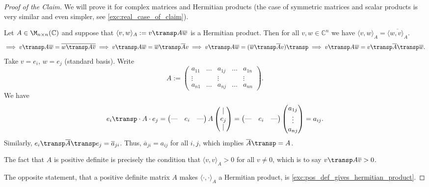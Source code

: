 \begin{proof}[Proof of the Claim]
    We will prove it for complex matrices and Hermitian products (the case of symmetric matrices and scalar products is very similar and even simpler, see \cref{exc:real_case_of_claim}).

    Let $A \in \M_{n \times n}(\mathbb{C})$ and suppose that $\langle v, w \rangle_A := v\transp A \overline{w}$ is a Hermitian product.
    Then for all $v, w \in \mathbb{C}^n$ we have $\langle v, w \rangle_A = \overline{\langle w, v \rangle_A}$.
    \[
        \implies v\transp A \overline{w} = \overline{w\transp A \overline{v}} \implies v\transp A \overline{w} = \overline{w}\transp \overline{A} v \implies v\transp A \overline{w} = (\overline{w}\transp \overline{A} v)\transp \implies v\transp A \overline{w} = v\transp \overline{A}\transp \overline{w}.
    \]
    Take $v = e_i$, $w = e_j$ (standard basis). Write
    \[
        A := \begin{pmatrix} a_{11} & \dots & a_{1j} & \dots & a_{1n} \\ \vdots & & \vdots & & \vdots \\ a_{n1} & \dots & a_{nj} & \dots & a_{nn} \end{pmatrix}.
    \]
    We have
    \[
        e_i\transp \cdot A \cdot e_j = \begin{pmatrix} \text{---} & e_i & \text{---} \end{pmatrix} A \begin{pmatrix} | \\ e_j \\ | \end{pmatrix} = \begin{pmatrix} \text{---} & e_i & \text{---} \end{pmatrix} \begin{pmatrix} a_{1j} \\ \vdots \\ a_{nj} \end{pmatrix} = a_{ij}.
    \]
    Similarly, $e_i\transp \overline{A}\transp e_j = \overline{a}_{ji}$.
    Thus, $\overline{a}_{ji} = a_{ij}$ for all $i, j$, which implies $\overline{A}\transp = A$.
    
    The fact that $A$ is positive definite is precisely the condition that $\langle v, v \rangle_A > 0$ for all $v \neq 0$, which is to say $v\transp A \overline{v} > 0$.
    
    The opposite statement, that a positive definite matrix $A$ makes $\langle \cdot, \cdot \rangle_A$ a Hermitian product, is \cref{exc:pos_def_gives_hermitian_product}.
\end{proof}

